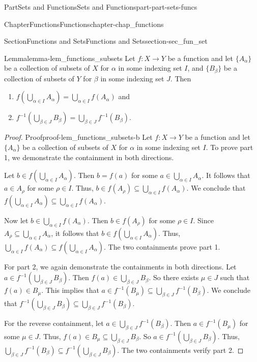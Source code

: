 \documentclass[oneside,10pt,]{book}
\numberwithin{equation}{chapter}
\begin{document}
\begin{partptx}{Part}{Sets and Functions}{}{Sets and Functions}{}{}{part-part-sets-funcs}
\begin{chapterptx}{Chapter}{Functions}{}{Functions}{}{}{chapter-chap_functions}
\begin{sectionptx}{Section}{Functions and Sets}{}{Functions and Sets}{}{}{section-sec_fun_set}
\begin{lemma}{Lemma}{}{}{lemma-lem_functions_subsets}%
Let \(f : X \to Y\) be a function and let \(\{A_{\alpha}\}\) be a collection of subsets of \(X\) for \(\alpha\) in some indexing set \(I\), and \(\{B_{\beta}\}\) be a collection of subsets of \(Y\) for \(\beta\) in some indexing set \(J\). Then%
\begin{enumerate}
\item{}\(f\left(\bigcup_{\alpha \in I} A_{\alpha}\right) = \bigcup_{\alpha \in I} f(A_{\alpha})\) and%
\item{}\(f^{-1}\left(\bigcup_{\beta \in J} B_{\beta}\right) = \bigcup_{\beta \in J} f^{-1}(B_{\beta})\).%
\end{enumerate}
%
\end{lemma}
\begin{proof}{Proof}{}{proof-lem_functions_subsets-b}
Let \(f : X \to Y\) be a function and let \(\{A_{\alpha}\}\) be a collection of subsets of \(X\) for \(\alpha\) in some indexing set \(I\). To prove part 1, we demonstrate the containment in both directions.%
\par
Let \(b \in f\left(\bigcup_{\alpha \in I} A_{\alpha}\right)\). Then \(b = f(a)\) for some \(a \in \bigcup_{\alpha \in I} A_{\alpha}\). It follows that \(a \in A_{\rho}\) for some \(\rho \in I\). Thus, \(b \in f(A_{\rho}) \subseteq \bigcup_{\alpha \in I} f(A_{\alpha})\). We conclude that \(f\left(\bigcup_{\alpha \in I} A_{\alpha}\right) \subseteq \bigcup_{\alpha \in I} f(A_{\alpha})\).%
\par
Now let \(b \in \bigcup_{\alpha \in I} f(A_{\alpha})\). Then \(b \in f(A_{\rho})\) for some \(\rho \in I\). Since \(A_{\rho} \subseteq \bigcup_{\alpha \in I} A_{\alpha}\), it follows that \(b \in f\left(\bigcup_{\alpha \in I} A_{\alpha}\right)\). Thus, \(\bigcup_{\alpha \in I} f(A_{\alpha}) \subseteq f\left(\bigcup_{\alpha \in I} A_{\alpha}\right)\). The two containments prove part 1.%
\par
For part 2, we again demonstrate the containments in both directions. Let \(a \in f^{-1}\left(\bigcup_{\beta \in J} B_{\beta}\right)\). Then \(f(a) \in \bigcup_{\beta \in J} B_{\beta}\). So there exists \(\mu \in J\) such that \(f(a) \in B_{\mu}\). This implies that \(a \in f^{-1}(B_{\mu}) \subseteq \bigcup_{\beta \in J} f^{-1}(B_{\beta})\). We conclude that \(f^{-1}\left(\bigcup_{\beta \in J} B_{\beta}\right) \subseteq \bigcup_{\beta \in J} f^{-1}(B_{\beta})\).%
\par
For the reverse containment, let \(a \in \bigcup_{\beta \in J} f^{-1}(B_{\beta})\). Then \(a \in f^{-1}(B_{\mu})\) for some \(\mu \in J\). Thus, \(f(a) \in B_{\mu} \subseteq \bigcup_{\beta \in J} B_{\beta}\). So \(a \in f^{-1}\left(\bigcup_{\beta \in J} B_{\beta}\right)\). Thus, \(\bigcup_{\beta \in J} f^{-1}(B_{\beta}) \subseteq f^{-1}\left(\bigcup_{\beta \in J} B_{\beta}\right)\). The two containments verify part 2.%

\end{proof}
\end{sectionptx}
\end{chapterptx}
\end{partptx}
\end{document}
